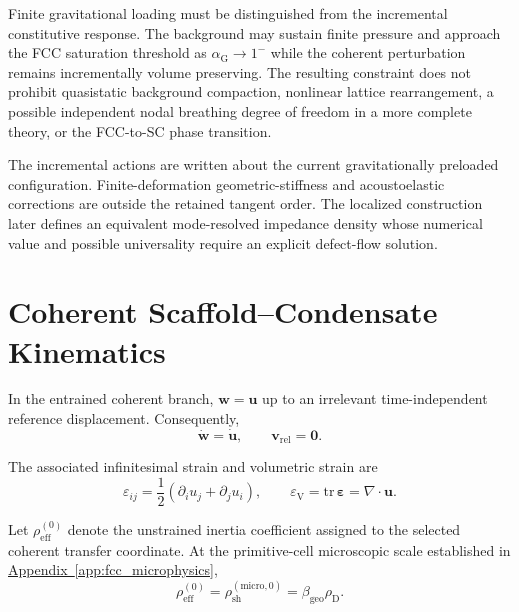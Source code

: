 Finite gravitational loading must be distinguished from the incremental constitutive response. The background may sustain finite pressure and approach the FCC saturation threshold as $\alpha_{\mathrm{G}}\rightarrow1^{-}$ while the coherent perturbation remains incrementally volume preserving. The resulting constraint does not prohibit quasistatic background compaction, nonlinear lattice rearrangement, a possible independent nodal breathing degree of freedom in a more complete theory, or the FCC-to-SC phase transition.

The incremental actions are written about the current gravitationally preloaded configuration. Finite-deformation geometric-stiffness and acoustoelastic corrections are outside the retained tangent order. The localized construction later defines an equivalent mode-resolved impedance density whose numerical value and possible universality require an explicit defect-flow solution.


\section{Coherent Scaffold--Condensate Kinematics}
\label{sec:AP_coherent_kinematics}

In the entrained coherent branch, $\mathbf{w}=\mathbf{u}$ up to an irrelevant time-independent reference displacement. Consequently,
\begin{equation}
    \dot{\mathbf{w}} = \dot{\mathbf{u}}, \qquad
    \mathbf{v}_{\mathrm{rel}} = \mathbf{0}.
\end{equation}

The associated infinitesimal strain and volumetric strain are
\begin{equation}
    \varepsilon_{ij}
    =
    \frac{1}{2}\left(\partial_i u_j+\partial_j u_i\right),
    \qquad
    \varepsilon_{\mathrm{V}}
    =
    \mathrm{tr}\,\boldsymbol{\varepsilon}
    =
    \nabla\cdot\mathbf{u}.
\end{equation}

Let $\rho_{\mathrm{eff}}^{(0)}$ denote the unstrained inertia coefficient assigned to the selected coherent transfer coordinate. At the primitive-cell microscopic scale established in \hyperref[app:fcc_microphysics]{Appendix~\ref*{app:fcc_microphysics}},
\begin{equation}
    \rho_{\mathrm{eff}}^{(0)}
    =
    \rho_{\mathrm{sh}}^{(\mathrm{micro},0)}
    =
    \beta_{\mathrm{geo}}\rho_{\mathrm{D}}.
\end{equation}

